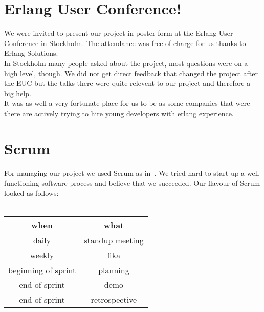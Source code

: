 \documentclass[11pt,a4paper]{report}
\begin{document}
\section{Erlang User Conference!}
We were invited to present our project in poster form at the
Erlang User Conference in Stockholm. The attendance was free of charge for us
thanks to Erlang Solutions. \\
In Stockholm many people asked about the project, most questions were on a high
level, though. We did not get direct feedback that changed the project after the
EUC but the talks there were quite relevent to our project and therefore a big
help. \\
It was as well a very fortunate place for us to be as some companies that were
there are actively trying to hire young developers with erlang experience.
\section{Scrum}
For managing our project we used Scrum as in~\cite{kniberg}.
We tried hard to start up a well functioning software process and believe that
we succeeded. Our flavour of Scrum looked as follows: \\ \\
\begin{tabular}{cc}
  when & what \\ \hline
  daily & standup meeting\\
  weekly & fika \\
  beginning of sprint & planning \\
  end of sprint & demo \\
  end of sprint & retrospective \\
\end{tabular}
\end{document}
